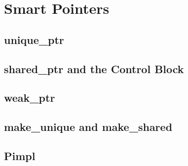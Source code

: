 \section{Smart Pointers}\label{sec:smart-ptrs}

\subsection{unique\_ptr}

\subsection{shared\_ptr and the Control Block}

\subsection{weak\_ptr}

\subsection{make\_unique and make\_shared}

\subsection{Pimpl}
